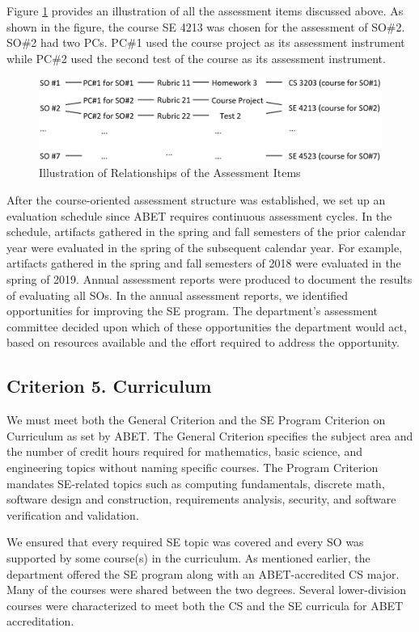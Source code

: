 \documentclass{article}
\begin{document}
Figure \ref{items} provides an illustration of all the assessment items discussed above.  As shown in the figure, the course SE 4213 was chosen for the assessment of SO\#2.  SO\#2 had two PCs.  PC\#1 used the course project as its assessment instrument while PC\#2 used the second test of the course as its assessment instrument.

\begin{figure}[htbp]
\centering
\includegraphics[width=\textwidth]{449_1.png}
\caption{Illustration of Relationships of the Assessment Items}
\label{items}
\end{figure}

After the course-oriented assessment structure was established, we set up an evaluation schedule since ABET requires continuous assessment cycles.  In the schedule, artifacts gathered in the spring and fall semesters of the prior calendar year were evaluated in the spring of the subsequent calendar year.  For example, artifacts gathered in the spring and fall semesters of 2018 were evaluated in the spring of 2019.  Annual assessment reports were produced to document the results of evaluating all SOs.  In the annual assessment reports, we identified opportunities for improving the SE program. The department’s assessment committee decided upon which of these opportunities the department would act, based on resources available and the effort required to address the opportunity.

\subsection{Criterion 5. Curriculum} \label{cur}
We must meet both the General Criterion and the SE Program Criterion on Curriculum as set by ABET.  The General Criterion specifies the subject area and the number of credit hours required for mathematics, basic science, and engineering topics without naming specific courses.  The Program Criterion mandates SE-related topics such as computing fundamentals, discrete math, software design and construction, requirements analysis, security, and software verification and validation.  

We ensured that every required SE topic was covered and every SO was supported by some course(s) in the curriculum.  As mentioned earlier, the department offered the SE program along with an ABET-accredited CS major. Many of the courses were shared between the two degrees. Several lower-division courses were characterized to meet both the CS and the SE curricula for ABET accreditation.  
\end{document}
